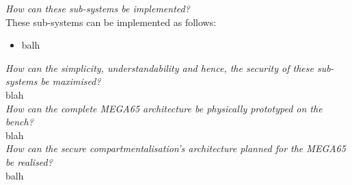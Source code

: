 \textit{How can these sub-systems be implemented?}\\
These sub-systems can be implemented as follows:
\begin{itemize}
\item{balh}
\end{itemize}

\textit{How can the simplicity, understandability and hence, the security of these sub-systems be maximised?}\\
blah
\\
\textit{How can the complete MEGA65 architecture be physically prototyped on the bench?}\\
blah
\\
\textit{How can the secure compartmentalisation's architecture planned for the MEGA65 be realised?}\\
balh
